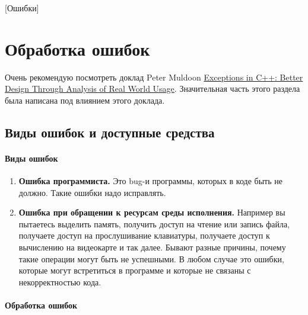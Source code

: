 [Ошибки]


\section{Обработка ошибок}
\label{section::Errors}

Очень рекомендую посмотреть доклад Peter Muldoon \href{https://youtu.be/HXJmrMnnDYQ?si=uylqtbTLdzKMrg9S}{Exceptions in C++: Better Design Through Analysis of Real World Usage}.
Значительная часть этого раздела была написана под влиянием этого доклада.

\subsection{Виды ошибок и доступные средства}

\paragraph{Виды ошибок}

\begin{enumerate}
\item \textbf{Ошибка программиста.}
Это bug-и программы, которых в коде быть не должно.
Такие ошибки надо исправлять.

\item \textbf{Ошибка при обращении к ресурсам среды исполнения.}
Например вы пытаетесь выделить память, получить доступ на чтение или запись файла, получаете доступ на прослушивание клавиатуры, получаете доступ к вычислению на видеокарте и так далее.
Бывают разные причины, почему такие операции могут быть не успешными.
В любом случае это ошибки, которые могут встретиться в  программе и которые не связаны с некорректностью кода.
\end{enumerate}

\paragraph{Обработка ошибок}

